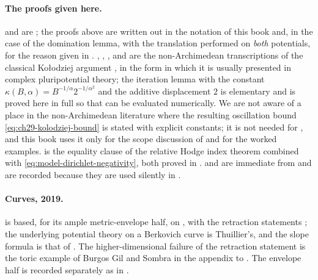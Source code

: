 \paragraph{The proofs given here.}
 and
 are \cite[Lemmas~8.3--8.4]{BFJ15}; the
proofs above are written out in the notation of this book and, in the case
of the domination lemma, with the translation performed on \emph{both}
potentials, for the reason given in
.  ,
, ,
 and  are the
non-Archimedean transcriptions of the classical Ko\l odziej argument
\cite{Kol98,Kol05}, in the form in which it is usually presented in complex
pluripotential theory; the iteration lemma with the constant
\(\kappa(B,\alpha)=B^{-1/\alpha}2^{-1/\alpha^2}\) and the additive
displacement \(2\) is elementary and is proved here in full so that
 can be evaluated numerically.  We are not
aware of a place in the non-Archimedean literature where the resulting
oscillation bound \eqref{eq:ch29-kolodziej-bound} is stated with explicit
constants; it is not needed for
, and this book uses it only for the
scope discussion of  and for the worked
examples.   is the equality clause of the
relative Hodge index theorem  combined with
\eqref{eq:model-dirichlet-negativity}, both proved in
.
 and
 are immediate from
 and are recorded because they are
used silently in \cite[\S8]{BFJ15}.

\paragraph{Curves, 2019.}
 is
based, for its ample metric-envelope half, on
\cite[Theorem~1.1]{GJKM19}, with the retraction statements
\cite[Proposition~1.2 and Propositions~3.5, 3.8]{GJKM19}; the underlying
potential theory on a Berkovich curve is Thuillier's, and the slope formula
is that of .  The higher-dimensional failure of
the retraction statement is the toric example of Burgos Gil and Sombra in
the appendix to \cite{GJKM19}.  The envelope half is recorded separately as
 in .

